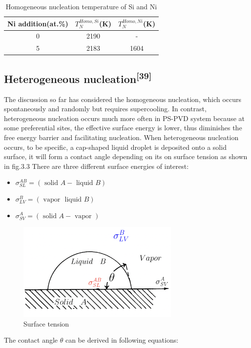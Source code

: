 \begin{table}[H]
\caption{Homogeneous nucleation temperature of Si and Ni}
\centering
\begin{tabular}{ccc}
\toprule
Ni addition(at.\%) & $T_{N}^{Homo,Si}$(K) & $T_{N}^{Homo,Ni}$(K)     \\
\midrule
0                  & 2190 & -    \\
5                  & 2183 & 1604 \\
\bottomrule
\end{tabular}
\end{table}

\subsection{Heterogeneous nucleation\textsuperscript{[39]}}
The discussion so far has considered the homogeneous nucleation, which occurs spontaneously and randomly but requires supercooling.  In contrast,  heterogeneous nucleation occurs much more often in PS-PVD system because at some preferential sites, the effective surface energy is lower, thus diminishes the free energy barrier and facilitating nucleation. 
When heterogeneous nucleation occurs, to be specific, a cap-shaped liquid droplet  is deposited onto a solid surface, it will form a contact angle depending on its on surface tension as shown in fig.3.3
There are three different surface energies of interest:
\begin{itemize}
  \item $\sigma_{S L}^{A B}=(\text { solid } A-\text { liquid } B)$
  \item $\sigma_{L V}^{B}=(\text { vapor } \text { liquid } B)$
  \item $\sigma_{S V}^{A}=(\text { solid } A-\text { vapor })$
\end{itemize}
\begin{figure}[H]
\centering
\includegraphics[width=8cm]{src/fig/fig33.5.png}
\caption{Surface tension}
\end{figure}
The contact angle $\theta $ can be  derived  in following equations:
